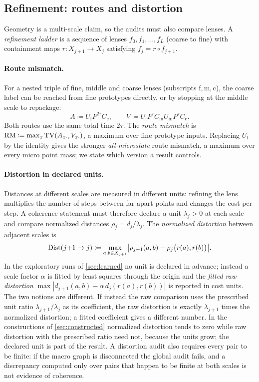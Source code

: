\subsection{Refinement: routes and distortion}

Geometry is a multi-scale claim, so the audits must also compare lenses.
A \emph{refinement ladder} is a sequence of lenses $f_0,f_1,\dots,f_L$ (coarse to fine) with containment maps $r\colon X_{j+1}\to X_j$ satisfying $f_j=r\circ f_{j+1}$.

\paragraph{Route mismatch.}
For a nested triple of fine, middle and coarse lenses (subscripts $\mathrm f,\mathrm m,\mathrm c$), the coarse label can be reached from fine prototypes directly, or by stopping at the middle scale to repackage:
\begin{equation}
A\coloneqq U_{\mathrm f}P^{2\tau}C_{\mathrm c},
\qquad
V\coloneqq U_{\mathrm f}P^{\tau}C_{\mathrm m}U_{\mathrm m}P^{\tau}C_{\mathrm c}.
\end{equation}
Both routes use the same total time $2\tau$.
The \emph{route mismatch} is $\mathrm{RM}\coloneqq\max_{x}\mathrm{TV}(A_{x\cdot},V_{x\cdot})$, a maximum over fine prototype inputs.
Replacing $U_{\mathrm f}$ by the identity gives the stronger \emph{all-microstate} route mismatch, a maximum over every micro point mass; we state which version a result controls.

\paragraph{Distortion in declared units.}
Distances at different scales are measured in different units: refining the lens multiplies the number of steps between far-apart points and changes the cost per step.
A coherence statement must therefore declare a unit $\lambda_j>0$ at each scale and compare normalized distances $\rho_j=d_j/\lambda_j$.
The \emph{normalized distortion} between adjacent scales is
\begin{equation}
\mathrm{Dist}(j{+}1\to j)\coloneqq\max_{a,b\in X_{j+1}}\bigl|\rho_{j+1}(a,b)-\rho_j\bigl(r(a),r(b)\bigr)\bigr|.
\label{eq:distortion}
\end{equation}
In the exploratory runs of \cref{sec:learned} no unit is declared in advance; instead a scale factor $\alpha$ is fitted by least squares through the origin and the \emph{fitted raw distortion} $\max|d_{j+1}(a,b)-\alpha\,d_j(r(a),r(b))|$ is reported in cost units.
The two notions are different.
If instead the raw comparison uses the prescribed unit ratio $\lambda_{j+1}/\lambda_j$ as its coefficient, the raw distortion is exactly $\lambda_{j+1}$ times the normalized distortion; a fitted coefficient gives a different number.
In the constructions of \cref{sec:constructed} normalized distortion tends to zero while raw distortion with the prescribed ratio need not, because the units grow; the declared unit is part of the result.
A distortion audit also requires every pair to be finite: if the macro graph is disconnected the global audit fails, and a discrepancy computed only over pairs that happen to be finite at both scales is not evidence of coherence.

